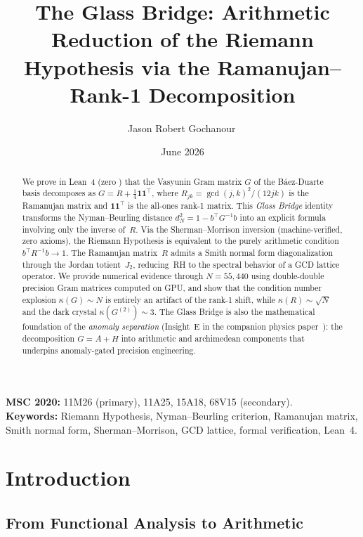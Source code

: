 \documentclass[11pt,a4paper]{article}
\title{%
  The Glass Bridge: Arithmetic Reduction of the Riemann\\
  Hypothesis via the Ramanujan--Rank-1 Decomposition%
}
\author{
  Jason Robert Gochanour\,\orcidlink{0000-0002-2862-526X}
}
\date{June 2026}
\begin{document}
\maketitle

\noindent
\textbf{MSC 2020:} 11M26 (primary), 11A25, 15A18, 68V15 (secondary).\\
\textbf{Keywords:} Riemann Hypothesis, Nyman--Beurling criterion,
Ramanujan matrix, Smith normal form, Sherman--Morrison, GCD lattice,
formal verification, Lean~4.

\begin{abstract}
We prove in Lean~4 (zero ) that the Vasyunin Gram matrix
$G$ of the B\'aez-Duarte basis decomposes as
$G = R + \frac{1}{4}\mathbf{1}\mathbf{1}^\top$,
where $R_{jk} = \gcd(j,k)^2/(12jk)$ is the Ramanujan matrix and
$\mathbf{1}\mathbf{1}^\top$ is the all-ones rank-1 matrix. This
\emph{Glass Bridge} identity transforms the Nyman--Beurling distance
$d_N^2 = 1 - b^\top G^{-1} b$ into an explicit formula involving
only the inverse of~$R$. Via the Sherman--Morrison inversion
(machine-verified, zero axioms), the Riemann Hypothesis is equivalent
to the purely arithmetic condition $b^\top R^{-1} b \to 1$.
The Ramanujan matrix~$R$ admits a Smith normal form
diagonalization through the Jordan totient~$J_2$, reducing~RH
to the spectral behavior of a GCD lattice operator. We provide
numerical evidence through $N = 55{,}440$ using double-double
precision Gram matrices computed on GPU, and show that the
condition number explosion $\kappa(G) \sim N$ is entirely
an artifact of the rank-1 shift, while $\kappa(R) \sim \sqrt{N}$
and the dark crystal $\kappa(G^{(2)}) \sim 3$.
The Glass Bridge is also the mathematical foundation of the
\emph{anomaly separation} (Insight~E in the companion
physics paper~\cite{cathedral-physics}): the decomposition
$G = A + H$ into arithmetic and archimedean components that
underpins anomaly-gated precision engineering.
\end{abstract}

\tableofcontents

\section{Introduction}
\label{sec:intro}

\subsection{From Functional Analysis to Arithmetic}
\end{document}
